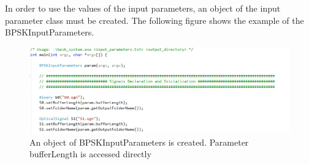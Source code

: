 In order to use the values of the input parameters, an object of the input parameter class must be created. The following figure shows the example of the BPSKInputParameters.
\renewcommand{\figurename}{Figure}
\begin{figure}[H]
\centering
\includegraphics[width=0.8\linewidth]{./chapter/simulator_structure/figures/ips_manual_parameters}
\caption{An object of BPSKInputParameters is created. Parameter bufferLength is accessed directly}
\label{fig:ipsmanualparameters}
\end{figure}

\cleardoublepage 